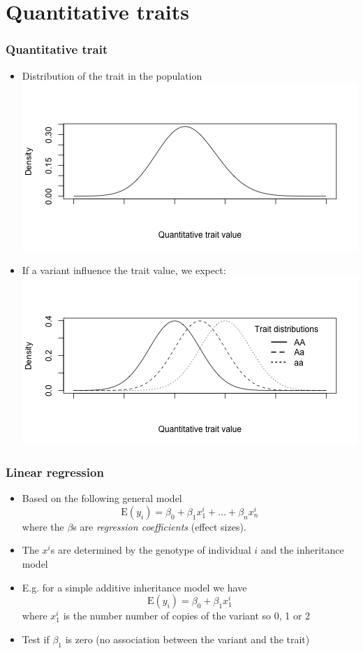 \documentclass[xcolor=pdftex,dvipsnames,table,10pt]{beamer}
\begin{document}
\section{Quantitative traits}
\begin{frame}
 \frametitle{Quantitative trait}
  \begin{itemize}
 \item<1-> Distribution of the trait in the population\\\vspace{-0.3cm}
 \includegraphics[scale=.4]{qtl_dist_pop.png}
  \item<2-> If a variant influence the trait value, we expect:\\\vspace{-0.3cm}
   \includegraphics[scale=.4]{qtl_dist.png}
\end{itemize} 
\end{frame}

\begin{frame}
  \frametitle{Linear regression}
  \small \vspace{-0.7cm}
  \begin{itemize}
  \item<1-> Based on the following general model  
   \[ \text{E}(y_i) = \beta_0 +\beta_1x^i_1+\ldots +\beta_nx^i_n\] where the $\beta$s are \emph{regression coefficients} (effect sizes).
   \item<1-> The $x^i$s are determined by the genotype of individual $i$ and the inheritance model 
 \item<2-> E.g. for a simple additive inheritance model we have 
 \[ \text{E}(y_i) = \beta_0 +\beta_1x^i_1\]
    where $x^i_1$ is the number number of copies of the variant so 0, 1 or 2
 \item<3-> Test if $\beta_1$ is zero (no association between the variant and the trait) 
  \end{itemize}
\end{frame}
\end{document}
